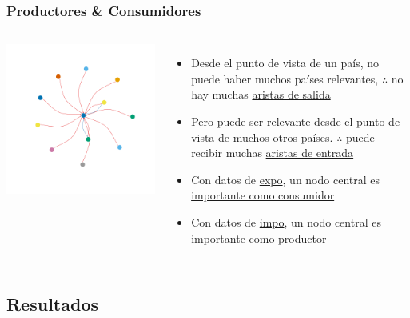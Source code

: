 \documentclass[compress]{beamer}
\begin{document}
\begin{frame}
\frametitle{Productores \& Consumidores}	
\begin{columns}
\includegraphics[width=\linewidth]{toy_graph1}

\begin{itemize}[label=\faRebel]
\item Desde el punto de vista de un país, no puede haber muchos países relevantes, $\therefore$ no hay muchas \underline{aristas de salida}
\item Pero puede ser relevante desde el punto de vista de muchos otros países.
$\therefore$ puede recibir muchas \underline{aristas de entrada}
\item Con datos de \underline{expo}, un nodo central es \underline{importante como consumidor}
\item Con datos de \underline{impo}, un nodo central es \underline{importante como productor}
\end{itemize}	
\end{columns}	
\end{frame}

\subsection{Resultados}
\end{document}
